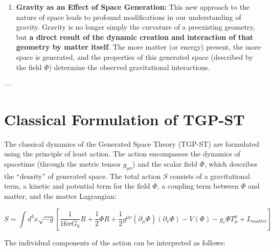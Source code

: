 \documentclass[11pt,a4paper]{article}
\begin{document}
\begin{enumerate}
    \item \textbf{Gravity as an Effect of Space Generation:}
    This new approach to the nature of space leads to profound modifications in our understanding of gravity. Gravity is no longer simply the curvature of a preexisting geometry, but \textbf{a direct result of the dynamic creation and interaction of that geometry by matter itself}. The more matter (or energy) present, the more space is generated, and the properties of this generated space (described by the field $\Phi$) determine the observed gravitational interactions.
\end{enumerate}


---

\section{Classical Formulation of TGP-ST}
\label{sec:FormulacjaKlasyczna}

The classical dynamics of the Generated Space Theory (TGP-ST) are formulated using the principle of least action. The action encompasses the dynamics of spacetime (through the metric tensor $g_{\mu\nu}$) and the scalar field $\Phi$, which describes the “density” of generated space. The total action $S$ consists of a gravitational term, a kinetic and potential term for the field $\Phi$, a coupling term between $\Phi$ and matter, and the matter Lagrangian:

\begin{equation}
    S = \int d^4x \sqrt{-g} \left[ \frac{1}{16\pi G_0}R + \frac{1}{2}\Phi R + \frac{1}{2}g^{\mu\nu}(\partial_\mu\Phi)(\partial_\nu\Phi) - V(\Phi) - g_{c}\Phi T^\mu_\mu + L_{matter} \right]
    \label{eq:FundamentalAction}
\end{equation}

The individual components of the action can be interpreted as follows:
\end{document}
